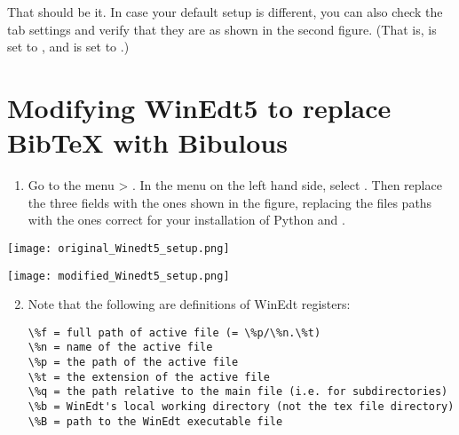 \documentclass[letterpaper,10pt,english]{sphinxmanual}
\begin{document}
That should be it. In case your default setup is different, you can also check the  tab settings and verify that they are as shown in the second figure. (That is,  is set to , and  is set to .)


\section{Modifying WinEdt5 to replace BibTeX with Bibulous}
\label{getting_started:modifying-winedt5-to-replace-bibtex-with-bibulous}\begin{enumerate}
\item {} 
Go to the menu  \textgreater{} . In the  menu on the left hand side, select . Then replace the three  fields with the ones shown in the figure, replacing the files paths with the ones correct for your installation of Python and .

\end{enumerate}

\texttt{[image: original\_Winedt5\_setup.png]}

\texttt{[image: modified\_Winedt5\_setup.png]}
\begin{enumerate}
\setcounter{enumi}{1}
\item {} 
Note that the following are definitions of WinEdt registers:

\begin{Verbatim}[commandchars=\\\{\}]
\%f = full path of active file (= \%p/\%n.\%t)
\%n = name of the active file
\%p = the path of the active file
\%t = the extension of the active file
\%q = the path relative to the main file (i.e. for subdirectories)
\%b = WinEdt's local working directory (not the tex file directory)
\%B = path to the WinEdt executable file
\end{Verbatim}

\end{enumerate}
\end{document}
